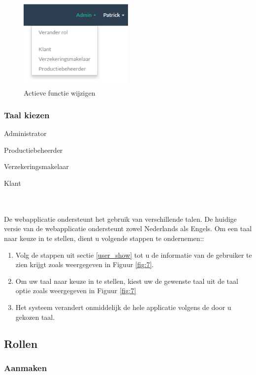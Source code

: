 \documentclass[11pt,openany]{article}
\newcommand{\cmark}{\ding{51}}%
\newcommand{\done}{\rlap{$\square$}{\raisebox{2pt}{\large\hspace{1pt}\cmark}}%
	\hspace{-2.5pt}}
\begin{document}
\begin{figure}
	\centering
	\includegraphics[width=0.5\textwidth]{img/fig10.png}
	\caption{Actieve functie wijzigen} 
	\label{fig:10} 
\end{figure}

\newpage
\subsubsection{Taal kiezen}
\begin{todolist}
	\item[\done] Administrator
	\item[\done] Productiebeheerder
	\item[\done] Verzekeringsmakelaar
	\item[\done] Klant 
\end{todolist}
\\
\\
De webapplicatie ondersteunt het gebruik van verschillende talen. 
De huidige versie van de webapplicatie ondersteunt zowel Nederlands als Engels. 
Om een taal naar keuze in te stellen, dient u volgende stappen te ondernemen::
\begin{enumerate}
	\item Volg de stappen uit sectie \ref{user_show} tot u de informatie van de gebruiker te zien krijgt zoals weergegeven in Figuur \ref{fig:7}.
	\item Om uw taal naar keuze in te stellen, kiest uw de gewenste taal uit de taal optie zoals weergegeven in Figuur \ref{fig:7}
	\item Het systeem verandert onmiddelijk de hele applicatie volgens de door u gekozen taal.
\end{enumerate}

\newpage
\subsection{Rollen}
\label{roles}
\subsubsection{Aanmaken}
\end{document}
